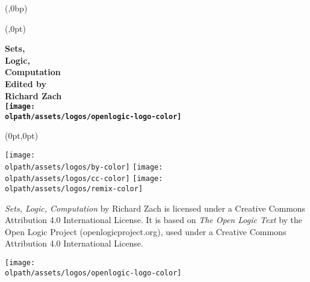 \documentclass{memoir}
\newcommand{\olpath}{../../../}
\newlength{\coverheight}
\newlength{\spinewidth}
\newlength{\spinepos} %
\newlength{\coverpos} %
\begin{document}
\pagestyle{empty}


\pagecolor{OLPiceblue}

\begin{textblock*}{\spinewidth}(\spinepos,0bp)%
\noindent\hfil{}\hfil
\end{textblock*}
\newbox\adjust
\begin{textblock*}{\spinepos}(\coverpos,0pt)
  \noindent\hfil
  \begin{minipage}[b][\coverheight][s]{.8\spinepos}
    \vfil
      \begin{raggedleft}
        \fontsize{48pt}{7em}\selectfont\bfseries\sffamily
        \setbox\adjust\hbox{\phantom{,}}
        Sets,\\ Logic,\\ Computation\usebox\adjust\\
      \vfil
      \normalfont\Huge
      \textbf{Edited by\usebox\adjust\\ Richard Zach}\usebox\adjust\\
      \vfil
      \texttt{[image: \\olpath/assets/logos/openlogic-logo-color]}%
\usebox\adjust\\
      \vspace*{1cm}
      \end{raggedleft}
  \end{minipage}
  \hfil
  \end{textblock*}

\begin{textblock*}{\spinepos}(0pt,0pt)
  \noindent\hfil
  \begin{minipage}[b][\coverheight][b]{.8\spinepos}
\begin{minipage}[b]{.9cm}
\texttt{[image: \\olpath/assets/logos/by-color]}
\texttt{[image: \\olpath/assets/logos/cc-color]}
\texttt{[image: \\olpath/assets/logos/remix-color]}
\end{minipage}
\hspace{.3cm}
\begin{minipage}[b]{5cm}
\sffamily\fontsize{8.5pt}{1em}\selectfont\textit{Sets, Logic, Computation}
by Richard Zach is licensed under a Creative Commons Attribution 4.0
International License. It is based on \textit{The Open Logic Text} by
the Open Logic Project (openlogicproject.org), used under a Creative
Commons Attribution 4.0 International License.
\end{minipage}
\hfill\color{OLPreflexblue}
\texttt{[image: \\olpath/assets/logos/openlogic-logo-color]}
\vspace*{1cm}
  \end{minipage}
  \hfil
  \end{textblock*}
\end{document}
